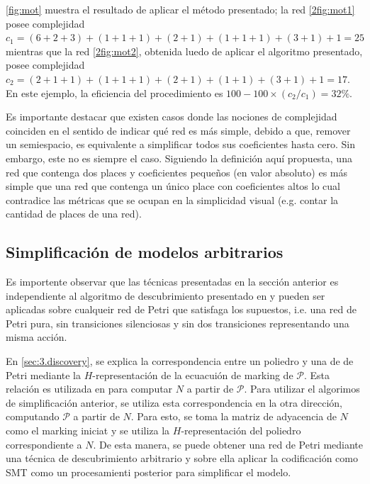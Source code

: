 \begin{example}
    \autoref{fig:mot} muestra el resultado de aplicar el método presentado; la red \autoref{2fig:mot1} posee
    complejidad $c_1 = (6 + 2 + 3) + (1 + 1 + 1) + (2 + 1) + (1+1+1) + (3+1) + 1 = 25$ mientras que 
    la red \autoref{2fig:mot2}, obtenida luedo de aplicar el algoritmo presentado, posee complejidad 
    $c_2 = (2+1+1) + (1+1+1) + (2+1) + (1+1) + (3+1) + 1 = 17$. En este ejemplo, la eficiencia del
    procedimiento es $100 - 100 \times (c_2 / c_1) = 32\%$.
\end{example}


Es importante destacar que existen casos donde las nociones de complejidad coinciden en el sentido de indicar
qué red es más simple, debido a que, remover un semiespacio, es equivalente a simplificar todos sus coeficientes
hasta cero. Sin embargo, este no es siempre el caso. Siguiendo la definición aquí propuesta, una red que contenga
dos places y coeficientes pequeños (en valor absoluto) es más simple que una red que contenga un único place con 
coeficientes altos lo cual contradice las métricas que se ocupan en la simplicidad visual (e.g. contar la cantidad
de places de una red).

\subsection{Simplificación de modelos arbitrarios}
\label{sec:3.simplification}

Es importente observar que las técnicas presentadas en la sección anterior es independiente al algoritmo de 
descubrimiento presentado en \cite{CarmonaC14} y pueden ser aplicadas sobre cualqueir
red de Petri que satisfaga los supuestos, i.e. una red de Petri pura, sin transiciones silenciosas y sin
dos transiciones representando una misma acción. 

En \autoref{sec:3.discovery}, se explica la correspondencia entre un poliedro y una de de Petri mediante
la $H$-representación de la ecuacuión de marking de $\mathcal{P}$. Esta relación es utilizada en \cite{CarmonaC14}
para computar $N$ a partir de $\mathcal{P}$. Para utilizar el algorimos de simplificación anterior, se utiliza
esta correspondencia en la otra dirección, computando $\mathcal{P}$ a partir de $N$. Para esto, se toma la matriz
de adyacencia de $N$ como el marking iniciat y se utiliza la $H$-representación del poliedro correspondiente 
a $N$. De esta manera, se puede obtener una red de Petri mediante una técnica de descubrimiento arbitrario
y sobre ella aplicar la codificación como SMT como un procesamienti posterior para simplificar el modelo.


